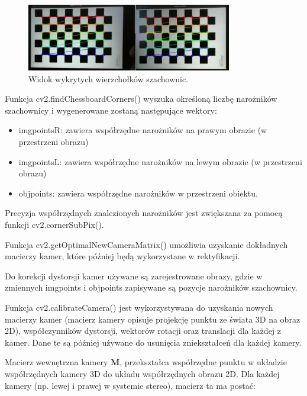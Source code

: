 \documentclass[magisterska]{pracadypl}
\begin{document}
\begin{figure}[H]  %
    \centering  %
    \includegraphics[width=0.8\textwidth]{images/calib.png}  %
    \captionsetup{font=footnotesize}
    \caption[Widok wykrytych wierzchołków szachownic. https://learnopencv.com/making-a-low-cost-stereo-camera-using-opencv/.]{Widok wykrytych wierzchołków szachownic.}
\end{figure}

Funkcja cv2.findChessboardCorners() wyszuka określoną liczbę narożników szachownicy
i wygenerowane zostaną następujące wektory:

\begin{itemize}
  \item imgpointsR: zawiera współrzędne narożników na prawym obrazie (w przestrzeni obrazu)
  \item imgpointsL: zawiera współrzędne narożników na lewym obrazie (w przestrzeni obrazu)
  \item objpoints: zawiera współrzędne narożników w przestrzeni obiektu.
\end{itemize}

Precyzja współrzędnych znalezionych narożników jest zwiększana za pomocą funkcji cv2.cornerSubPix().

Funkcja cv2.getOptimalNewCameraMatrix() umożliwia uzyskanie dokładnych macierzy kamer, które później będą wykorzystane w rektyfikacji.

Do korekcji dystorsji kamer używane są zarejestrowane obrazy, gdzie w zmiennych imgpoints i objpoints zapisywane są pozycje narożników szachownicy.

Funkcja cv2.calibrateCamera() jest wykorzystywana do uzyskania nowych macierzy kamer (macierz kamery opisuje projekcję punktu ze świata 3D na obraz 2D), współczynników dystorsji, wektorów rotacji oraz translacji dla każdej z kamer. Dane te są później używane do usunięcia zniekształceń dla każdej kamery.

Macierz wewnętrzna kamery $\mathbf{M}$, przekształca współrzędne punktu w układzie współrzędnych kamery 3D do układu współrzędnych obrazu 2D. Dla każdej kamery (np. lewej i prawej w systemie stereo), macierz ta ma postać:
\end{document}
